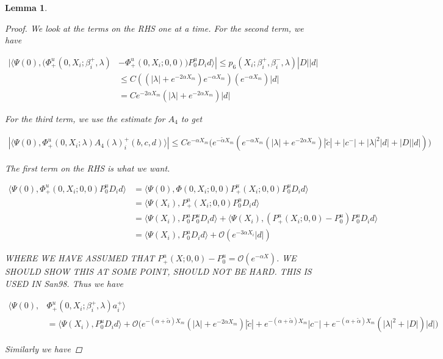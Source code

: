 \documentclass[12pt]{article}
\newtheorem{lemma}{Lemma}
\begin{document}
\begin{lemma}
\begin{proof}
We look at the terms on the RHS one at a time. For the second term, we have

\begin{align*}
|\langle \Psi(0), (\Phi^u_+(0, X_i; \beta_i^+, \lambda) &- \Phi^u_+(0, X_i; 0, 0)) P^u_0 D_i d \rangle| \leq p_6(X_i; \beta_i^+, \beta_i^-, \lambda)|D||d| \\
&\leq C( ( |\lambda| + e^{-2 \alpha X_m} ) e^{-\alpha X_m})(e^{-\alpha X_m})|d| \\
&=C e^{-2 \alpha X_m}(|\lambda| + e^{-2 \alpha X_m})|d|
\end{align*}

For the third term, we use the estimate for $A_4$ to get

\begin{align*}
|\langle \Psi(0), \Phi^u_+(0, X_i; \lambda) A_4(\lambda)_i^+(b,c,d) \rangle| 
\leq C e^{-\alpha X_m}\Big( e^{-\tilde{\alpha}X_m}( e^{-\alpha X_m} (|\lambda| + e^{-2 \alpha X_m}) |\tilde{c}| + |c^-| + |\lambda|^2 |d| + |D||d| ) \Big)
\end{align*}

The first term on the RHS is what we want.

\begin{align*}
\langle \Psi(0), \Phi^u_+(0, X_i; 0, 0) P^u_0 D_i d \rangle &= \langle \Psi(0), \Phi(0, X_i; 0, 0) P^u_+(X_i; 0, 0) P^u_0 D_i d \rangle \\
&= \langle \Psi(X_i), P^u_+(X_i; 0, 0) P^u_0 D_i d \rangle \\
&= \langle \Psi(X_i), P^u_0 P^u_0 D_i d \rangle + \langle \Psi(X_i), (P^u_+(X_i; 0, 0) - P^u_0) P^u_0 D_i d \rangle \\
&= \langle \Psi(X_i), P^u_0 D_i d \rangle + \mathcal{O}(e^{-3 \alpha X_i}|d|)
\end{align*}

WHERE WE HAVE ASSUMED THAT $P^u_+(X; 0, 0) - P^u_0 = \mathcal{O}(e^{-\alpha X})$. WE SHOULD SHOW THIS AT SOME POINT, SHOULD NOT BE HARD. THIS IS USED IN San98. Thus we have

\begin{align*}
\langle \Psi(0), &\Phi^u_+(0, X_i; \beta_i^+, \lambda) a_i^+ \rangle \\
&= \langle \Psi(X_i), P^u_0 D_i d \rangle + \mathcal{O}\Big( e^{-(\alpha + \tilde{\alpha}) X_m} (|\lambda| + e^{-2 \alpha X_m}) |\tilde{c}| + e^{-(\alpha + \tilde{\alpha})X_m} |c^-| 
+ e^{-(\alpha + \tilde{\alpha})X_m}(|\lambda|^2 + |D| )|d| \Big)
\end{align*}

Similarly we have


\end{proof}
\end{lemma}
\end{document}
